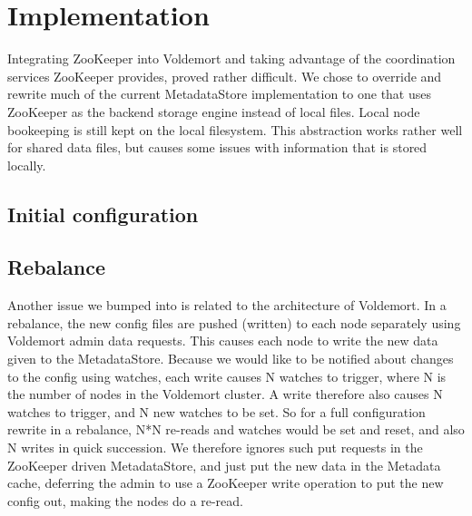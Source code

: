 
\section{Implementation}
Integrating ZooKeeper into Voldemort and taking advantage of the coordination services ZooKeeper provides, proved rather difficult.
We chose to override and rewrite much of the current MetadataStore implementation to one that uses ZooKeeper as the backend storage engine instead of local files. Local node bookeeping is still kept on the local filesystem.
This abstraction works rather well for shared data files, but causes some issues with information that is stored locally.

\subsection{Initial configuration}


\subsection{Rebalance}
Another issue we bumped into is related to the architecture of Voldemort.
In a rebalance, the new config files are pushed (written) to each node separately using Voldemort admin data requests. This causes each node to write the new data given to the MetadataStore.
Because we would like to be notified about changes to the config using watches, each write causes N watches to trigger, where N is the number of nodes in the Voldemort cluster.
A write therefore also causes N watches to trigger, and N new watches to be set. So for a full configuration rewrite in a rebalance, N*N re-reads and watches would be set and reset, and also N writes in quick succession.
We therefore ignores such put requests in the ZooKeeper driven MetadataStore, and just put the new data in the Metadata cache, deferring the admin to use a ZooKeeper write operation to put the new config out, making the nodes do a re-read.



